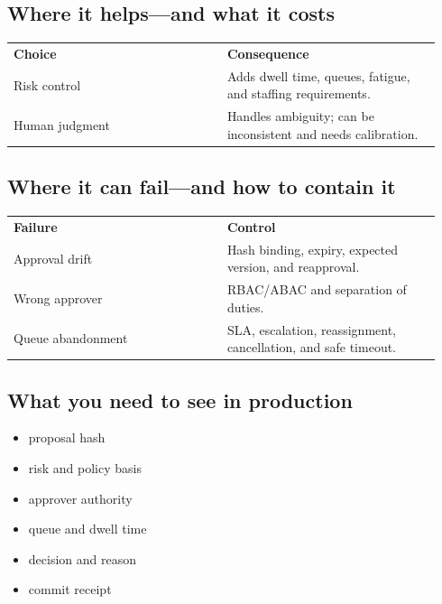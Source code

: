 \subsection{Where it helps—and what it costs}

\BookTableStart
\small
\begin{tabular}{@{}Y{0.4700\linewidth}Y{0.4700\linewidth}@{}}
\color{white}\bfseries \textbf{Choice} & \color{white}\bfseries \textbf{Consequence} \\
Risk control & Adds dwell time, queues, fatigue, and staffing requirements. \\
Human judgment & Handles ambiguity; can be inconsistent and needs calibration. \\
\end{tabular}
\BookTableEnd

\subsection{Where it can fail—and how to contain it}

\BookTableStart
\small
\begin{tabular}{@{}Y{0.4700\linewidth}Y{0.4700\linewidth}@{}}
\color{white}\bfseries \textbf{Failure} & \color{white}\bfseries \textbf{Control} \\
Approval drift & Hash binding, expiry, expected version, and reapproval. \\
Wrong approver & RBAC/ABAC and separation of duties. \\
Queue abandonment & SLA, escalation, reassignment, cancellation, and safe timeout. \\
\end{tabular}
\BookTableEnd

\subsection{What you need to see in production}

\begin{itemize}

\item proposal hash

\item risk and policy basis

\item approver authority

\item queue and dwell time

\item decision and reason

\item commit receipt

\end{itemize}

